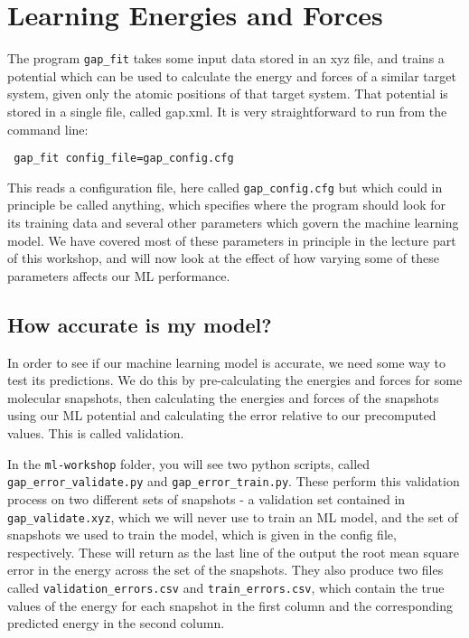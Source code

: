 \documentclass{article}
\begin{document}
\section{Learning Energies and Forces}

The program \verb|gap_fit| takes some input data stored in an xyz file, and trains a potential which can be used to calculate the energy and forces of a similar target system, given only the atomic positions of that target system. That potential is stored in a single file, called gap.xml. It is very straightforward to run from the command line:

\verb| gap_fit config_file=gap_config.cfg |

This reads a configuration file, here called \verb|gap_config.cfg| but which could in principle be called anything, which specifies where the program should look for its training data and several other parameters which govern the machine learning model. We have covered most of these parameters in principle in the lecture part of this workshop, and will now look at the effect of how varying some of these parameters affects our ML performance.

\subsection{How accurate is my model?}

In order to see if our machine learning model is accurate, we need some way to test its predictions. We do this by pre-calculating the energies and forces for some molecular snapshots, then calculating the energies and forces of the snapshots using our ML potential and calculating the error relative to our precomputed values. This is called validation.

In the \verb|ml-workshop| folder, you will see two python scripts, called \verb|gap_error_validate.py| and \verb|gap_error_train.py|. These perform this validation process on two different sets of snapshots - a validation set contained in \verb|gap_validate.xyz|, which we will never use to train an ML model, and the set of snapshots we used to train the model, which is given in the config file, respectively. These will return as the last line of the output the root mean square error in the energy across the set of the snapshots. They also produce two files called \verb|validation_errors.csv| and \verb|train_errors.csv|, which contain the true values of the energy for each snapshot in the first column and the corresponding predicted energy in the second column.
\end{document}
